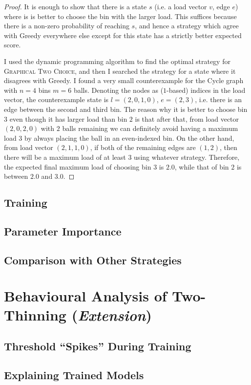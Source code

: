 \begin{proof}
It is enough to show that there is a state $s$ (i.e. a load vector $v$, edge $e$) where is is better to choose the bin with the larger load. This suffices because there is a non-zero probability of reaching $s$, and hence a strategy which agree with Greedy everywhere else except for this state has a strictly better expected score.


I used the dynamic programming algorithm to find the optimal strategy for \textsc{Graphical Two Choice}, and then I searched the strategy for a state where it disagrees with Greedy. I found a very small counterexample for the Cycle graph with $n=4$ bins $m=6$ balls. Denoting the nodes as ($1$-based) indices in the load vector, the counterexample state is $l=(2,0,1,0)$, $e=(2,3)$, i.e. there is an edge between the second and third bin. The reason why it is better to choose bin $3$ even though it has larger load than bin $2$ is that after that, from load vector $(2,0,2,0)$ with $2$ balls remaining we can definitely avoid having a maximum load $3$ by always placing the ball in an even-indexed bin. On the other hand, from load vector $(2,1,1,0)$, if both of the remaining edges are $(1,2)$, then there will be a maximum load of at least $3$ using whatever strategy. Therefore, the expected final maximum load of choosing bin $3$ is $2.0$, while that of bin $2$ is between $2.0$ and $3.0$.
\end{proof}

\subsection{Training}


\subsection{Parameter Importance}


\subsection{Comparison with Other Strategies}


\section{Behavioural Analysis of Two-Thinning (\textit{Extension})}


\subsection{Threshold ``Spikes'' During Training}


\subsection{Explaining Trained Models}